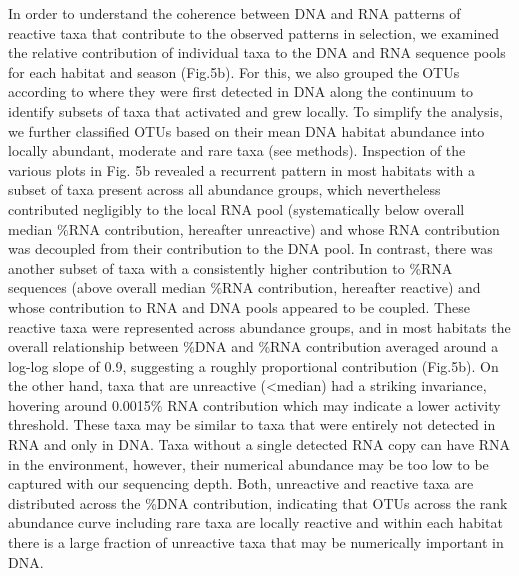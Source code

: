 \documentclass[12pt,a4paper]{article} %
\begin{document}
In order to understand the coherence between DNA and RNA patterns of reactive taxa that contribute to the observed patterns in selection, we examined the relative contribution of individual taxa to the DNA and RNA sequence pools for each habitat and season (Fig.5b). For this, we also grouped the OTUs according to where they were first detected in DNA along the continuum to identify subsets of taxa that activated and grew locally. To simplify the analysis, we further classified OTUs based on their mean DNA habitat abundance into locally abundant, moderate and rare taxa (see methods). Inspection of the various plots in Fig. 5b revealed a recurrent pattern in most habitats with a subset of taxa present across all abundance groups, which nevertheless contributed negligibly to the local RNA pool (systematically below overall median \%RNA contribution, hereafter unreactive) and whose RNA contribution was decoupled from their contribution to the DNA pool. In contrast, there was another subset of taxa with a consistently higher contribution to \%RNA sequences (above overall median \%RNA contribution, hereafter reactive) and whose contribution to RNA and DNA pools appeared to be coupled. These reactive taxa were represented across abundance groups, and in most habitats the overall relationship between \%DNA and \%RNA contribution averaged around a log-log slope of 0.9, suggesting a roughly proportional contribution (Fig.5b). On the other hand, taxa that are unreactive (<median) had a striking invariance, hovering around 0.0015\% RNA contribution which may indicate a lower activity threshold. These taxa may be similar to taxa that were entirely not detected in RNA and only in DNA. Taxa without a single detected RNA copy can have RNA in the environment, however, their numerical abundance may be too low to be captured with our sequencing depth. Both, unreactive and reactive taxa are distributed across the \%DNA contribution, indicating that OTUs across the rank abundance curve including rare taxa are locally reactive and within each habitat there is a large fraction of unreactive taxa that may be numerically important in DNA.
\end{document}
